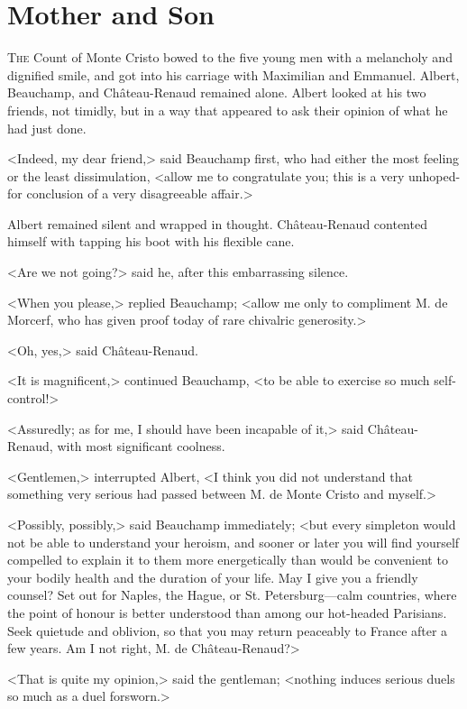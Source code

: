 \chapter{Mother and Son} 

 \lettrine{T}{he} Count of Monte Cristo bowed to the five young men with a melancholy and dignified smile, and got into his carriage with Maximilian and Emmanuel. Albert, Beauchamp, and Château-Renaud remained alone. Albert looked at his two friends, not timidly, but in a way that appeared to ask their opinion of what he had just done. 

 <Indeed, my dear friend,> said Beauchamp first, who had either the most feeling or the least dissimulation, <allow me to congratulate you; this is a very unhoped-for conclusion of a very disagreeable affair.> 

 Albert remained silent and wrapped in thought. Château-Renaud contented himself with tapping his boot with his flexible cane. 

 <Are we not going?> said he, after this embarrassing silence. 

 <When you please,> replied Beauchamp; <allow me only to compliment M. de Morcerf, who has given proof today of rare chivalric generosity.> 

 <Oh, yes,> said Château-Renaud. 

 <It is magnificent,> continued Beauchamp, <to be able to exercise so much self-control!> 

 <Assuredly; as for me, I should have been incapable of it,> said Château-Renaud, with most significant coolness. 

 <Gentlemen,> interrupted Albert, <I think you did not understand that something very serious had passed between M. de Monte Cristo and myself.> 

 <Possibly, possibly,> said Beauchamp immediately; <but every simpleton would not be able to understand your heroism, and sooner or later you will find yourself compelled to explain it to them more energetically than would be convenient to your bodily health and the duration of your life. May I give you a friendly counsel? Set out for Naples, the Hague, or St. Petersburg—calm countries, where the point of honour is better understood than among our hot-headed Parisians. Seek quietude and oblivion, so that you may return peaceably to France after a few years. Am I not right, M. de Château-Renaud?>

<That is quite my opinion,> said the gentleman; <nothing induces serious duels so much as a duel forsworn.> 

